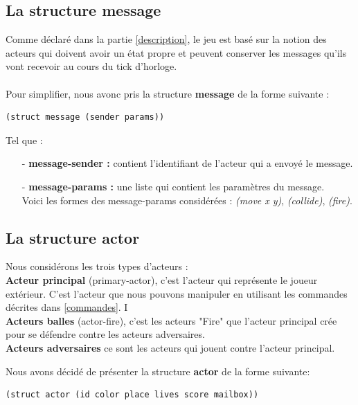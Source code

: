 \documentclass[a4paper]{article}
\begin{document}
\subsection{La structure message }
Comme déclaré dans la partie \ref{description}, le jeu est basé sur la notion des acteurs qui doivent avoir un état propre et peuvent conserver les messages qu'ils vont recevoir au cours du tick d'horloge.\\
\\
 Pour simplifier, nous avonc pris la structure \textbf{message} de la forme suivante : 
\vspace{0.3cm}
\begin{lstlisting}
(struct message (sender params))
\end{lstlisting}
Tel que :
\begin{itemize}
    \item[-] \textbf{message-sender :} contient l'identifiant de l'acteur qui a envoyé le message.
    \item[-] \textbf{message-params :} une liste qui contient les paramètres du message.\\ Voici les formes des message-params considérées : \textit{(move x y)}, \textit{(collide)}, \textit{(fire)}.
\end{itemize}

\subsection{La structure actor}\label{actor}
Nous considérons les trois types d'acteurs :\\
\textbf{Acteur principal} (primary-actor), c'est l'acteur qui représente le joueur extérieur. C'est l'acteur que nous pouvons manipuler en utilisant les commandes décrites dans \ref{commandes}. I \\
\textbf{Acteurs balles} (actor-fire), c'est les acteurs "Fire" que l'acteur principal crée pour se défendre contre les acteurs adversaires. \\
\textbf{Acteurs adversaires} ce sont les acteurs qui jouent contre l'acteur principal. 


Nous avons décidé de présenter la structure \textbf{actor} de la forme suivante:
\vspace{0.3cm}
\begin{lstlisting}
(struct actor (id color place lives score mailbox))
\end{lstlisting}
\end{document}
